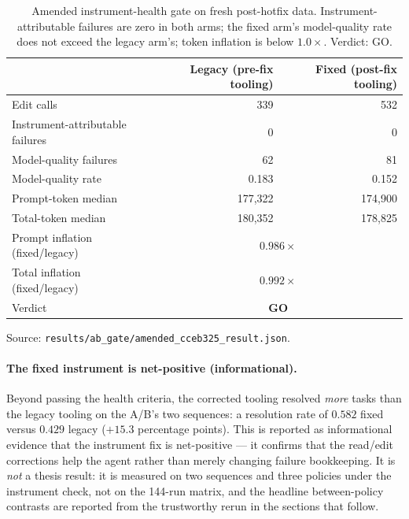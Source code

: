 \begin{table}[htbp]
  \centering
  \caption{Amended instrument-health gate on fresh post-hotfix data. Instrument-attributable
  failures are zero in both arms; the fixed arm's model-quality rate does not exceed the
  legacy arm's; token inflation is below $1.0\times$. Verdict: GO.}
  \label{tab:instrument}
  \begin{tabular}{lrr}
    \toprule
    & Legacy (pre-fix tooling) & Fixed (post-fix tooling) \\
    \midrule
    Edit calls                       & 339      & 532      \\
    Instrument-attributable failures & 0        & 0        \\
    Model-quality failures           & 62       & 81       \\
    Model-quality rate               & 0.183    & 0.152    \\
    Prompt-token median              & 177{,}322 & 174{,}900 \\
    Total-token median               & 180{,}352 & 178{,}825 \\
    \midrule
    Prompt inflation (fixed/legacy)  & \multicolumn{2}{c}{$0.986\times$} \\
    Total inflation (fixed/legacy)   & \multicolumn{2}{c}{$0.992\times$} \\
    Verdict                          & \multicolumn{2}{c}{\textbf{GO}} \\
    \bottomrule
  \end{tabular}
  \par\smallskip
  {\footnotesize Source: \texttt{results/ab\_gate/amended\_cceb325\_result.json}.}
\end{table}

\paragraph{The fixed instrument is net-positive (informational).}
Beyond passing the health criteria, the corrected tooling resolved \emph{more} tasks than
the legacy tooling on the A/B's two sequences: a resolution rate of $0.582$ fixed versus
$0.429$ legacy ($+15.3$ percentage points). This is reported as informational evidence that
the instrument fix is net-positive --- it confirms that the read/edit corrections help the
agent rather than merely changing failure bookkeeping. It is \emph{not} a thesis result: it
is measured on two sequences and three policies under the instrument check, not on the
144-run matrix, and the headline between-policy contrasts are reported from the trustworthy
rerun in the sections that follow.
